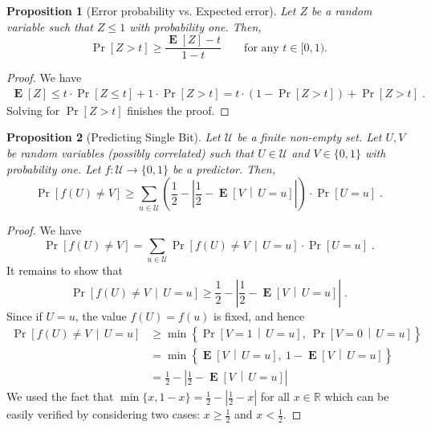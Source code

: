 \documentclass[11pt]{article}
\newtheorem{proposition}{Proposition}
\newcommand{\R}{\mathbb{R}}
\newcommand{\U}{\mathcal{U}}
\DeclareMathOperator{\Exp}{\mathbf{E}}
\begin{document}
\begin{proposition}[Error probability vs. Expected error]
\label{proposition:error-probability-vs-expected-error}
Let $Z$ be a random variable such that $Z \le 1$ with probability one.
Then,
$$
\Pr[Z > t] \ge \frac{\Exp[Z] - t}{1 - t} \qquad \text{for any $t \in [0, 1)$.}
$$
\end{proposition}

\begin{proof}
We have
\begin{align*}
\Exp[Z]
\le t \cdot \Pr[Z \le t] + 1 \cdot \Pr[Z > t]
= t \cdot (1 - \Pr[Z > t]) + \Pr[Z > t] \; .
\end{align*}
Solving for $\Pr[Z > t]$ finishes the proof.
\end{proof}

\begin{proposition}[Predicting Single Bit]
\label{proposition:single-bit}
Let $\U$ be a finite non-empty set. Let $U,V$ be random variables (possibly
correlated) such that $U \in \U$ and $V \in \{0,1\}$ with probability one. Let
$f:\U \to \{0,1\}$ be a predictor. Then,
$$
\Pr\left[ f(U) \neq V \right]
\ge \sum_{u \in \U} \left( \frac{1}{2} - \left| \frac{1}{2} -  \Exp \left[V \, \middle| \, U = u\right] \right| \right) \cdot \Pr[U = u] \; .
$$
\end{proposition}

\begin{proof}
We have
$$
\Pr \left[ f(U) \neq V \right] = \sum_{u \in \U} \Pr \left[ f(U) \neq V \, \middle| \, U = u \right] \cdot \Pr[U = u] \; .
$$
It remains to show that
$$
\Pr\left[ f(U) \neq V \, \middle| \, U = u \right]
\ge
\frac{1}{2} - \left| \frac{1}{2} -  \Exp \left[V \, \middle| \, U = u \right] \right| \; .
$$
Since if  $U=u$, the value $f(U) = f(u)$ is fixed, and hence
\begin{align*}
\Pr\left[ f(U) \neq V \, \middle| \, U = u \right]
& \ge \min\left\{ \Pr \left[ V = 1 \, \middle| \, U = u \right], \ \Pr \left[ V = 0 \, \middle| \, U = u \right] \right\} \\
& = \min\left\{ \Exp \left[ V  \, \middle| \, U = u \right], \ 1 - \Exp \left[ V \, \middle| \, U = u \right] \right\} \\
& = \frac{1}{2} - \left| \frac{1}{2} -  \Exp \left[ V  \, \middle| \, U = u \right] \right|
\end{align*}
We used the fact that $\min\{x, 1 - x\} = \frac{1}{2} - \left| \frac{1}{2} - x \right|$ for all $x \in \R$
which can be easily verified by considering two cases: $x \ge \frac{1}{2}$ and $x < \frac{1}{2}$.
\end{proof}
\end{document}
